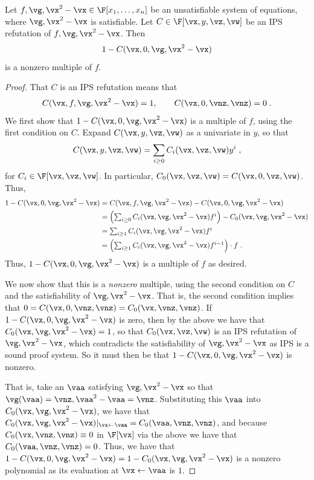 \documentclass{toc}
\begin{document}
\begin{lemma}\label{res:lbs-mult:strategy}
        Let $f,\vg,\vx^2-\vx\in\F[x_1,\ldots,x_n]$ be an unsatisfiable system of equations, where $\vg,\vx^2-\vx$ is satisfiable.  Let $C\in\F[\vx,y,\vz,\vw]$ be an IPS refutation of $f,\vg,\vx^2-\vx$.  Then
        \[
                1-C(\vx,0,\vg,\vx^2-\vx)
        \]
        is a nonzero multiple of $f$.
\end{lemma}
\begin{proof}
        That $C$ is an IPS refutation means that
        \[
                C(\vx,f,\vg,\vx^2-\vx)=1,\qquad
                C(\vx,0,\vnz,\vnz)=0
                \;.
        \]
        We first show that $1-C(\vx,0,\vg,\vx^2-\vx)$ is a multiple of $f$, using the first condition on $C$. Expand $C(\vx,y,\vz,\vw)$ as a univariate in $y$, so that
        \[
                C(\vx,y,\vz,\vw)=\sum_{i\ge 0} C_i(\vx,\vz,\vw)y^i
                \;,
        \]
        for $C_i\in\F[\vx,\vz,\vw]$. In particular, $C_0(\vx,\vz,\vw)=C(\vx,0,\vz,\vw)$. Thus,
        \begin{align*}
                1-C(\vx,0,\vg,\vx^2-\vx)
                &=C(\vx,f,\vg,\vx^2-\vx)-C(\vx,0,\vg,\vx^2-\vx)\\
                &=\textstyle\left(\sum_{i\ge 0} C_i(\vx,\vg,\vx^2-\vx)f^i\right)-C_0(\vx,\vg,\vx^2-\vx)\\
                &=\textstyle\sum_{i\ge 1} C_i(\vx,\vg,\vx^2-\vx)f^i\\
                &=\textstyle\left(\sum_{i\ge 1} C_i(\vx,\vg,\vx^2-\vx)f^{i-1}\right)\cdot f
                \;.
        \end{align*}
        Thus, $1-C(\vx,0,\vg,\vx^2-\vx)$ is a multiple of $f$ as desired.

        We now show that this is a \emph{nonzero} multiple, using the second condition on $C$ and the satisfiability of $\vg,\vx^2-\vx$.  That is, the second condition implies that $0=C(\vx,0,\vnz,\vnz)=C_0(\vx,\vnz,\vnz)$.  If $1-C(\vx,0,\vg,\vx^2-\vx)$ is zero, then by the above we have that $C_0(\vx,\vg,\vx^2-\vx)=1$, so that $C_0(\vx,\vz,\vw)$ is an IPS refutation of $\vg,\vx^2-\vx$, which contradicts the satisfiability of $\vg,\vx^2-\vx$ as IPS is a sound proof system.  So it must then be that $1-C(\vx,0,\vg,\vx^2-\vx)$ is nonzero.

        That is, take an $\vaa$ satisfying $\vg,\vx^2-\vx$ so that $\vg(\vaa)=\vnz,\vaa^2-\vaa=\vnz$. Substituting this $\vaa$ into $C_0(\vx,\vg,\vx^2-\vx)$, we have that $C_0(\vx,\vg,\vx^2-\vx)|_{\vx\leftarrow\vaa}=C_0(\vaa,\vnz,\vnz)$, and because $C_0(\vx,\vnz,\vnz)\equiv0$ in $\F[\vx]$ via the above we have that $C_0(\vaa,\vnz,\vnz)=0$. Thus, we have that $1-C(\vx,0,\vg,\vx^2-\vx)=1-C_0(\vx,\vg,\vx^2-\vx)$ is a nonzero polynomial as its evaluation at $\vx\leftarrow\vaa$ is $1$.
\end{proof}
\end{document}
